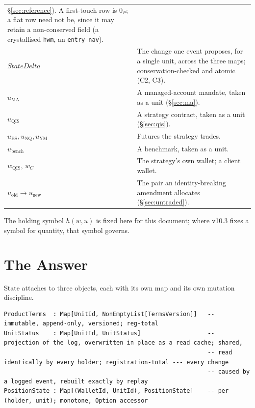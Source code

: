 \documentclass[11pt,a4paper]{article}
\begin{document}
\begin{longtable}{p{3.4cm}p{11.4cm}}
\S\ref{sec:reference}). A first-touch row is $0_P$; a flat row need not be, since it may
retain a non-conserved field (a crystallised \texttt{hwm}, an \texttt{entry\_nav}). \\
$\mathit{StateDelta}$ & The change one event proposes, for a single unit, across the three
maps; conservation-checked and atomic (C2, C3). \\
\addlinespace
$u_{\mathrm{MA}}$ & A managed-account mandate, taken as a unit (\S\ref{sec:ma}). \\
$u_{\mathrm{QIS}}$ & A strategy contract, taken as a unit (\S\ref{sec:qis}). \\
$u_{\mathrm{ES}},u_{\mathrm{NQ}},u_{\mathrm{YM}}$ & Futures the strategy trades. \\
$u_{\mathrm{bench}}$ & A benchmark, taken as a unit. \\
$w_{\mathrm{QIS}}$, $w_C$ & The strategy's own wallet; a client wallet. \\
$u_{\mathrm{old}}\!\to\!u_{\mathrm{new}}$ & The pair an identity-breaking amendment
allocates (\S\ref{sec:untraded}). \\
\bottomrule
\end{longtable}

\noindent The holding symbol $h(w,u)$ is fixed here for this document; where v10.3 fixes a
symbol for quantity, that symbol governs.

\section{The Answer}
\label{sec:answer}

State attaches to three objects, each with its own map and its own mutation discipline.

\begin{lstlisting}[language={},basicstyle=\ttfamily\footnotesize]
ProductTerms  : Map[UnitId, NonEmptyList[TermsVersion]]   -- immutable, append-only, versioned; reg-total
UnitStatus    : Map[UnitId, UnitStatus]                   -- projection of the log, overwritten in place as a read cache; shared,
                                                          -- read identically by every holder; registration-total --- every change
                                                          -- caused by a logged event, rebuilt exactly by replay
PositionState : Map[(WalletId, UnitId), PositionState]    -- per (holder, unit); monotone, Option accessor
\end{lstlisting}
\end{document}
